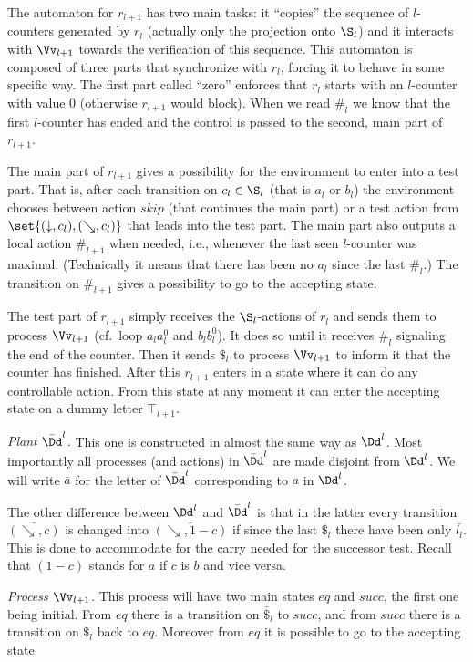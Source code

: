 \documentclass{llncs}
\newcommand{\sskip}{\mathit{skip}}
\newcommand{\inctest}{\searrow}
\newcommand{\eqtest}{\downarrow}
\begin{document}
The automaton for $r_{l+1}$ has two main tasks: it ``copies'' the
sequence of $l$-counters generated by $r_l$ (actually only the
projection onto $\S_l$) and it interacts with $\Vv_{l+1}$ towards the
verification of this sequence. This automaton is composed of three parts that synchronize
with $r_l$, forcing it to behave in  some specific way. The first part called
``zero'' enforces that $r_l$ starts with an $l$-counter with value 0
(otherwise $r_{l+1}$ would block). When we read $\#_l$ we know that
the first $l$-counter has ended and the control is passed to the
second, main part of $r_{l+1}$.

The main part of $r_{l+1}$ gives a possibility for the environment
to enter into a test part. That is, after each transition on $c_l\in\S_l$
(that is $a_l$ or $b_l$) the environment chooses between action
$\sskip$ (that continues the main part) or a test action from
$\set{(\eqtest,c_l), (\inctest,c_l)}$  that leads into the test
part. The main part also outputs a local action $\#_{l+1}$ when
needed, i.e., whenever the last seen $l$-counter was
maximal. (Technically it means that there has been no $a_l$ since the
last $\#_l$.) The transition on $\#_{l+1}$ gives a possibility to go
to the accepting state.

The test part of $r_{l+1}$ simply receives the $\S_l$-actions of
$r_l$ and sends them to process $\Vv_{l+1}$ (cf.~loop $a_la_l^0$ and $b_lb_l^0$). It does so until it receives
$\#_l$ signaling the end of the counter. Then it sends $\$_l$ to
process $\Vv_{l+1}$ to inform it that the counter has finished. After this
$r_{l+1}$ enters in a state where it can do any controllable
action. From this state at any moment it can enter the accepting
state on a dummy letter $\top_{l+1}$.


\noindent\textit{Plant $\bar\Dd^l$.}
This one is constructed in almost the same way as $\Dd^l$. Most
importantly all processes (and actions) in $\bar\Dd^l$ are made disjoint from
$\Dd^l$. We will write $\bar a$ for the letter of $\bar\Dd^l$
corresponding to $a$ in $\Dd^l$.

The other difference between $\Dd^l$ and $\bar\Dd^l$ is that in the
latter every transition $\bar{(\inctest,c)}$ is changed into
$\bar{(\inctest,1-c)}$ if since the last $\$_l$ there have been only
$\bar{l_l}$. This is done to accommodate for the carry needed for the successor test. Recall that
$(1-c)$ stands for $a$ if $c$ is $b$  and vice versa.



\noindent\textit{Process $\Vv_{l+1}$.}
This process will have two main states $\mathit{eq}$ and $\mathit{succ}$, the first one
being initial. From $\mathit{eq}$ there is a transition on $\bar\$_l$ to $\mathit{succ}$,
and from $\mathit{succ}$ there is a transition on $\$_l$ back to
$\mathit{eq}$. Moreover from $\mathit{eq}$ it is possible to go to the accepting state.
\end{document}
